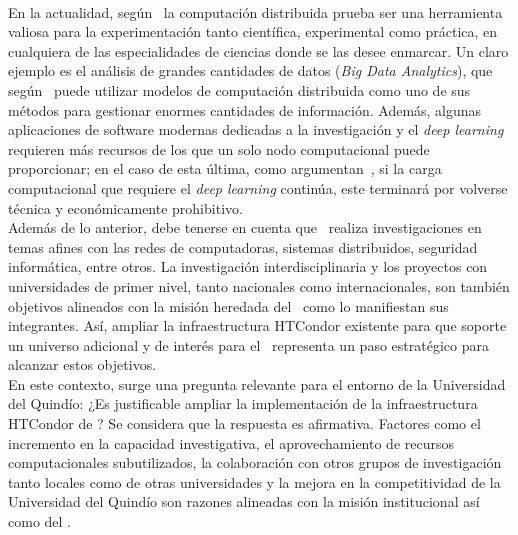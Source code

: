 \label{cap:justificacion}
\mbox{}\\


En la actualidad, según~\cite{Bianchi2013} la computación distribuida prueba ser una herramienta valiosa para la experimentación tanto científica, experimental como práctica, en cualquiera de las especialidades de ciencias donde se las desee enmarcar. Un claro ejemplo es el análisis de grandes cantidades de datos (\textit{Big Data Analytics}), que según~\cite{Tsai2015} puede utilizar modelos de computación distribuida como uno de sus métodos para gestionar enormes cantidades de información. Además, algunas aplicaciones de software modernas dedicadas a la investigación y el \textit{deep learning} requieren más recursos de los que un solo nodo computacional puede proporcionar; en el caso de esta última, como argumentan~\cite{Thomson2023}, si la carga computacional que requiere el \textit{deep learning} continúa, este terminará por volverse técnica y económicamente prohibitivo.
\\
Además de lo anterior, debe tenerse en cuenta que \GRID~realiza investigaciones en temas afines con las redes de computadoras, sistemas distribuidos, seguridad informática, entre otros. La investigación interdisciplinaria y los proyectos con universidades de primer nivel, tanto nacionales como internacionales, son también objetivos alineados con la misión heredada del \GRID~como lo manifiestan sus integrantes. Así, ampliar la infraestructura HTCondor existente para que soporte un universo adicional y de interés para el \GRID~representa un paso estratégico para alcanzar estos objetivos.
\\
En este contexto, surge una pregunta relevante para el entorno de la Universidad del Quindío: ¿Es justificable ampliar la implementación de la infraestructura HTCondor de \GRID? Se considera que la respuesta es afirmativa. Factores como el incremento en la capacidad investigativa, el aprovechamiento de recursos computacionales subutilizados, la colaboración con otros grupos de investigación tanto locales como de otras universidades y la mejora en la competitividad de la Universidad del Quindío son razones alineadas con la misión institucional así como del \GRID.

